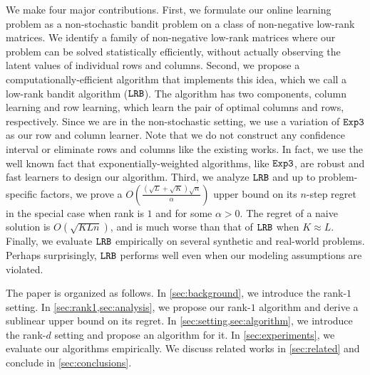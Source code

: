 We make four major contributions. First, we formulate our online learning problem as a non-stochastic bandit problem on a class of non-negative low-rank matrices. We identify a family of non-negative low-rank matrices where our problem can be solved statistically efficiently, without actually observing the latent values of individual rows and columns. Second, we propose a computationally-efficient algorithm that implements this idea, which we call a low-rank bandit algorithm (${\tt LRB}$). The algorithm has two components, column learning and row learning, which learn the pair  of optimal columns and rows, respectively. Since we are in the non-stochastic setting, we use a variation of ${\tt Exp3}$ \citep{auer2002nonstochastic} as our row and column learner. Note that we do not construct any confidence interval or eliminate rows and columns like the existing works. In fact, we use the well known fact that exponentially-weighted algorithms, like ${\tt Exp3}$, are robust and fast learners to design our algorithm. Third, we analyze ${\tt LRB}$ and up to problem-specific factors, we prove a $O\left(\frac{\left(\sqrt{L } + \sqrt{K }\right)\sqrt{n}}{\alpha}\right)$ upper bound on its $n$-step regret in the special case when rank is $1$ and for some $\alpha > 0$. The regret of a naive solution is $O(\sqrt{K L n})$, and is much worse than that of ${\tt LRB}$ when $K \approx L$. Finally, we evaluate ${\tt LRB}$ empirically on several synthetic and real-world problems. Perhaps surprisingly, ${\tt LRB}$ performs well even when our modeling assumptions are violated.

The paper is organized as follows. In \cref{sec:background}, we introduce the rank-$1$ setting. In \cref{sec:rank1,sec:analysis}, we propose our rank-$1$ algorithm and derive a sublinear upper bound on its regret. In \cref{sec:setting,sec:algorithm}, we introduce the rank-$d$ setting and propose an algorithm for it. In \cref{sec:experiments}, we evaluate our algorithms empirically. We discuss related works in \cref{sec:related} and conclude in \cref{sec:conclusions}. 
